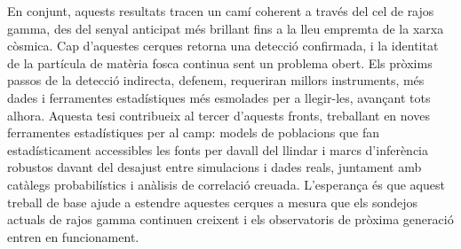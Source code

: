 \begin{otherlanguage}{catalan}
En conjunt, aquests resultats tracen un camí coherent a través del cel de rajos gamma, des del senyal anticipat més brillant fins a la lleu empremta de la xarxa còsmica. Cap d'aquestes cerques retorna una detecció confirmada, i la identitat de la partícula de matèria fosca continua sent un problema obert. Els pròxims passos de la detecció indirecta, defenem, requeriran millors instruments, més dades i ferramentes estadístiques més esmolades per a llegir-les, avançant tots alhora. Aquesta tesi contribueix al tercer d'aquests fronts, treballant en noves ferramentes estadístiques per al camp: models de poblacions que fan estadísticament accessibles les fonts per davall del llindar i marcs d'inferència robustos davant del desajust entre simulacions i dades reals, juntament amb catàlegs probabilístics i anàlisis de correlació creuada. L'esperança és que aquest treball de base ajude a estendre aquestes cerques a mesura que els sondejos actuals de rajos gamma continuen creixent i els observatoris de pròxima generació entren en funcionament.
\end{otherlanguage}
